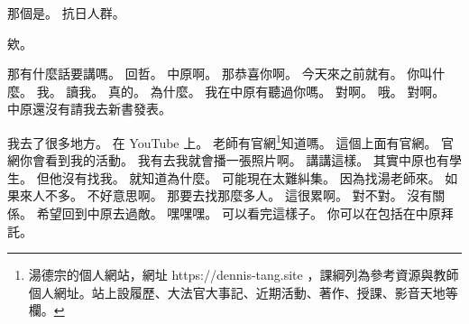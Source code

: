 \hypertarget{c01:cue:2292}{}那個是。
\hypertarget{c01:cue:2293}{}抗日人群。

\hypertarget{c01:cue:2294}{}欸。

\hypertarget{c01:cue:2295}{}那有什麼話要講嗎。
\hypertarget{c01:cue:2296}{}回哲。
\hypertarget{c01:cue:2297}{}中原啊。
\hypertarget{c01:cue:2298}{}那恭喜你啊。
\hypertarget{c01:cue:2299}{}今天來之前就有。
\hypertarget{c01:cue:2300}{}你叫什麼。
\hypertarget{c01:cue:2301}{}我。
\hypertarget{c01:cue:2302}{}讀我。
\hypertarget{c01:cue:2303}{}真的。
\hypertarget{c01:cue:2304}{}為什麼。
\hypertarget{c01:cue:2305}{}我在中原有聽過你嗎。
\hypertarget{c01:cue:2306}{}對啊。
\hypertarget{c01:cue:2307}{}哦。
\hypertarget{c01:cue:2308}{}對啊。
\hypertarget{c01:cue:2309}{}中原還沒有請我去新書發表。

\hypertarget{c01:cue:2310}{}我去了很多地方。
\hypertarget{c01:cue:2311}{}在 YouTube 上。
\hypertarget{c01:cue:2312}{}老師有官網\footnote{湯德宗的個人網站，網址 https://dennis-tang.site ，課綱列為參考資源與教師個人網址。站上設履歷、大法官大事記、近期活動、著作、授課、影音天地等欄。}知道嗎。
\hypertarget{c01:cue:2313}{}這個上面有官網。
\hypertarget{c01:cue:2314}{}官網你會看到我的活動。
\hypertarget{c01:cue:2315}{}我有去我就會播一張照片啊。
\hypertarget{c01:cue:2316}{}講講這樣。
\hypertarget{c01:cue:2317}{}其實中原也有學生。
\hypertarget{c01:cue:2318}{}但他沒有找我。
\hypertarget{c01:cue:2319}{}就知道為什麼。
\hypertarget{c01:cue:2320}{}可能現在太難糾集。
\hypertarget{c01:cue:2321}{}因為找湯老師來。
\hypertarget{c01:cue:2322}{}如果來人不多。
\hypertarget{c01:cue:2323}{}不好意思啊。
\hypertarget{c01:cue:2324}{}那要去找那麼多人。
\hypertarget{c01:cue:2325}{}這很累啊。
\hypertarget{c01:cue:2326}{}對不對。
\hypertarget{c01:cue:2327}{}沒有關係。
\hypertarget{c01:cue:2328}{}希望回到中原去過敵。
\hypertarget{c01:cue:2329}{}嘿嘿嘿。
\hypertarget{c01:cue:2330}{}可以看完這樣子。
\hypertarget{c01:cue:2331}{}你可以在包括在中原拜託。

